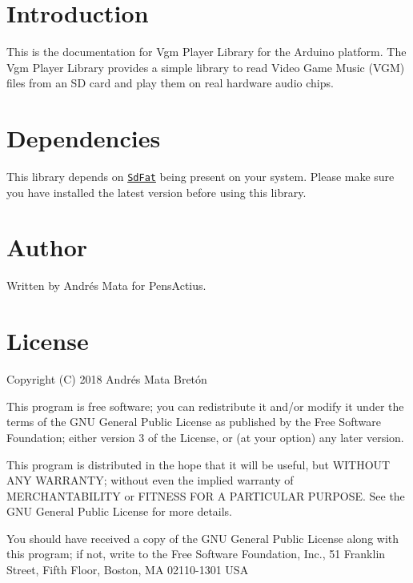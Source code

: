 \hypertarget{index_intro_sec}{}\section{Introduction}\label{index_intro_sec}
This is the documentation for Vgm Player Library for the Arduino platform. The Vgm Player Library provides a simple library to read Video Game Music (V\+GM) files from an SD card and play them on real hardware audio chips.\hypertarget{index_dependencies}{}\section{Dependencies}\label{index_dependencies}
This library depends on \href{https://github.com/greiman/SdFat}{\tt Sd\+Fat} being present on your system. Please make sure you have installed the latest version before using this library.\hypertarget{index_author}{}\section{Author}\label{index_author}
Written by Andrés Mata for Pens\+Actius.\hypertarget{index_license}{}\section{License}\label{index_license}
Copyright (C) 2018 Andrés Mata Bretón

This program is free software; you can redistribute it and/or modify it under the terms of the G\+NU General Public License as published by the Free Software Foundation; either version 3 of the License, or (at your option) any later version.

This program is distributed in the hope that it will be useful, but W\+I\+T\+H\+O\+UT A\+NY W\+A\+R\+R\+A\+N\+TY; without even the implied warranty of M\+E\+R\+C\+H\+A\+N\+T\+A\+B\+I\+L\+I\+TY or F\+I\+T\+N\+E\+SS F\+OR A P\+A\+R\+T\+I\+C\+U\+L\+AR P\+U\+R\+P\+O\+SE. See the G\+NU General Public License for more details.

You should have received a copy of the G\+NU General Public License along with this program; if not, write to the Free Software Foundation, Inc., 51 Franklin Street, Fifth Floor, Boston, MA 02110-\/1301 U\+SA 